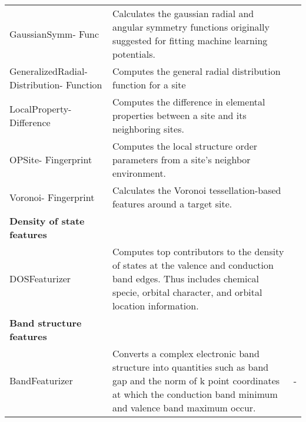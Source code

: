 \begin{center}
\begin{longtable}{M{3.0cm} M{6.0cm} M{2.5cm}}
  GaussianSymm- Func & Calculates the gaussian radial and angular symmetry functions originally suggested for fitting machine learning potentials. & \cite{Behler2011,Khorshidi2016}  \\
  GeneralizedRadial- Distribution- Function & Computes the general radial distribution function for a site & \cite{Seko2017}  \\
  LocalProperty- Difference & Computes the difference in elemental properties between a site and its neighboring sites. & \cite{Ward2017, Jong2016} \\
  OPSite- Fingerprint & Computes the local structure order parameters from a site's neighbor environment. & \cite{Zimmermann2017} \\
  Voronoi- Fingerprint & Calculates the Voronoi tessellation-based features around a target site. & \cite{Peng2011,Wang2019} \\
  \hline
  \textbf{Density of state features} & & \\
  \hline
  DOSFeaturizer & Computes top contributors to the density of states at the valence and conduction band edges. Thus includes chemical specie, orbital character, and orbital location information. & \cite{Dylla2020} \\
  \hline
  \textbf{Band structure features} & & \\
  \hline
  BandFeaturizer & Converts a complex electronic band structure into quantities such as band gap and the norm of k point coordinates at which the conduction band minimum and valence band maximum occur. & - \\
  \hline
\end{longtable}
\end{center}
